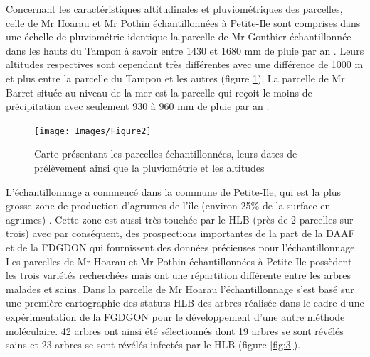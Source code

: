 \documentclass[
  11pt,
  french,
  a4paper,
  extrafontsizes,onecolumn,openright
  ]{memoir}
\begin{document}
Concernant les caractéristiques altitudinales et pluviométriques des parcelles, celle de Mr Hoarau et Mr Pothin échantillonnées à Petite-Ile sont comprises dans une échelle de pluviométrie identique la parcelle de Mr Gonthier échantillonnée dans les hauts du Tampon à savoir entre 1430 et 1680 mm de pluie par an \autocite{equipe_artists_-_ur_aida_meteor_2021}. Leurs altitudes respectives sont cependant très différentes avec une différence de 1000 m et plus entre la parcelle du Tampon et les autres (figure \ref{fig:2}). La parcelle de Mr Barret située au niveau de la mer est la parcelle qui reçoit le moins de précipitation avec seulement 930 à 960 mm de pluie par an \autocite{equipe_artists_-_ur_aida_meteor_2021}.

\scriptsize

\begin{figure}

{\centering \texttt{[image: Images/Figure2]} 

}

\caption{Carte présentant les parcelles échantillonnées, leurs dates de prélèvement ainsi que la pluviométrie et les altitudes}\label{fig:2}
\end{figure}

\normalsize

L'échantillonnage a commencé dans la commune de Petite-Ile, qui est la plus grosse zone de production d'agrumes de l'île (environ 25\% de la surface en agrumes) \autocite{guilloteau_utilisation_2018}. Cette zone est aussi très touchée par le HLB (près de 2 parcelles sur trois) avec par conséquent, des prospections importantes de la part de la DAAF et de la FDGDON qui fournissent des données précieuses pour l'échantillonnage. Les parcelles de Mr Hoarau et Mr Pothin échantillonnées à Petite-Ile possèdent les trois variétés recherchées mais ont une répartition différente entre les arbres malades et sains.
\vfill
\newpage
Dans la parcelle de Mr Hoarau l'échantillonnage s'est basé sur une première cartographie des statuts HLB des arbres réalisée dans le cadre d`une expérimentation de la FGDGON pour le développement d'une autre méthode moléculaire. 42 arbres ont ainsi été sélectionnés dont 19 arbres se sont révélés sains et 23 arbres se sont révélés infectés par le HLB (figure \ref{fig:3}).

\scriptsize
\end{document}
